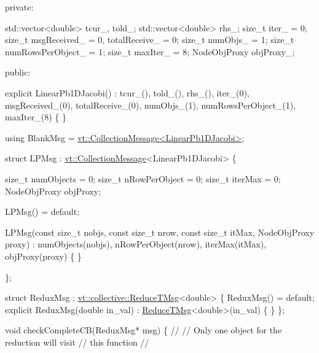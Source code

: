 \begin{DoxyCodeInclude}
\textcolor{keyword}{private}:

  std::vector<double> tcur\_, told\_;
  std::vector<double> rhs\_;
  \textcolor{keywordtype}{size\_t} iter\_ = 0;
  \textcolor{keywordtype}{size\_t} msgReceived\_ = 0, totalReceive\_ = 0;
  \textcolor{keywordtype}{size\_t} numObjs\_ = 1;
  \textcolor{keywordtype}{size\_t} numRowsPerObject\_ = 1;
  \textcolor{keywordtype}{size\_t} maxIter\_ = 8;
  NodeObjProxy objProxy\_;

\textcolor{keyword}{public}:

  \textcolor{keyword}{explicit} LinearPb1DJacobi() :
    tcur\_(), told\_(), rhs\_(), iter\_(0),
    msgReceived\_(0), totalReceive\_(0),
    numObjs\_(1), numRowsPerObject\_(1), maxIter\_(8)
  \{ \}


  \textcolor{keyword}{using} BlankMsg = \hyperlink{structvt_1_1vrt_1_1collection_1_1_collection_message}{vt::CollectionMessage<LinearPb1DJacobi>};

  \textcolor{keyword}{struct }LPMsg : \hyperlink{structvt_1_1vrt_1_1collection_1_1_collection_message}{vt::CollectionMessage}<LinearPb1DJacobi> \{

    \textcolor{keywordtype}{size\_t} numObjects = 0;
    \textcolor{keywordtype}{size\_t} nRowPerObject = 0;
    \textcolor{keywordtype}{size\_t} iterMax = 0;
    NodeObjProxy objProxy;

    LPMsg() = \textcolor{keywordflow}{default};

    LPMsg(\textcolor{keyword}{const} \textcolor{keywordtype}{size\_t} nobjs, \textcolor{keyword}{const} \textcolor{keywordtype}{size\_t} nrow, \textcolor{keyword}{const} \textcolor{keywordtype}{size\_t} itMax, NodeObjProxy proxy) :
      numObjects(nobjs), nRowPerObject(nrow), iterMax(itMax), objProxy(proxy)
    \{ \}

  \};

  \textcolor{keyword}{struct }ReduxMsg : \hyperlink{structvt_1_1collective_1_1reduce_1_1operators_1_1_reduce_t_msg}{vt::collective::ReduceTMsg}<double> \{
    ReduxMsg() = \textcolor{keywordflow}{default};
    \textcolor{keyword}{explicit} ReduxMsg(\textcolor{keywordtype}{double} in\_val) : \hyperlink{namespacevt_1_1collective_a28b82d5d48c9bc6e4fd738fcbf9e0f62}{ReduceTMsg}<double>(in\_val) \{ \}
  \};

  \textcolor{keywordtype}{void} checkCompleteCB(ReduxMsg* msg) \{
    \textcolor{comment}{//}
    \textcolor{comment}{// Only one object for the reduction will visit}
    \textcolor{comment}{// this function}
    \textcolor{comment}{//}


\end{DoxyCodeInclude}

